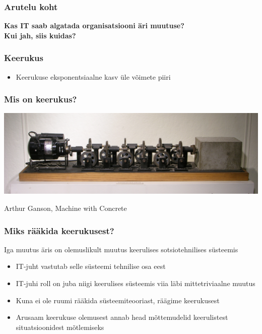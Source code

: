 \begin{frame}[fragile]
  \frametitle{Arutelu koht}
		\begin{center}
			\textbf{Kas IT saab algatada organisatsiooni äri muutuse? \\Kui jah, siis kuidas?}
		\end{center}
\end{frame}

\begin{frame}[fragile]
  \frametitle{Keerukus}
	\begin{itemize}
		\item Keerukuse eksponentsiaalne kasv üle võimete piiri
	\end{itemize}
\end{frame}

\begin{frame}[fragile]
  \frametitle{Mis on keerukus?}
  	\begin{center}
			\includegraphics[width=\textwidth]{concrete.jpg}
	\end{center}
	Arthur Ganson, Machine with Concrete
\end{frame}

\begin{frame}[fragile]
  \frametitle{Miks rääkida keerukusest?}
  Iga muutus äris on olemuslikult muutus keerulises sotsiotehnilises süsteemis
	\begin{itemize}
		\item IT-juht vastutab selle süsteemi tehnilise osa eest
		\item IT-juhi roll on juba niigi keerulises süsteemis viia läbi mittetriviaalne muutus
		\item Kuna ei ole ruumi rääkida süsteemiteooriast, räägime keerukusest
		\item Arusaam keerukuse olemusest annab head mõttemudelid keerulistest situatsioonidest mõtlemiseks
	\end{itemize}
\end{frame}

